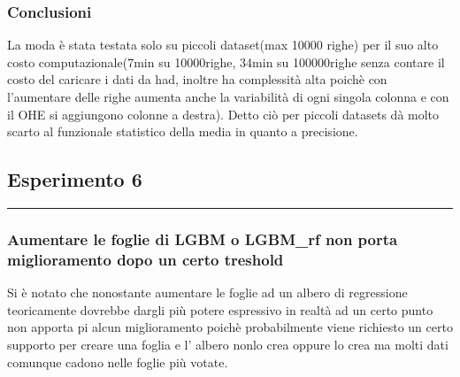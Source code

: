 \documentclass[11pt]{article}
\begin{document}
    \subsubsection{Conclusioni}\label{conclusioni}

La moda è stata testata solo su piccoli dataset(max 10000 righe) per il
suo alto costo computazionale(7min su 10000righe, 34min su 100000righe
senza contare il costo del caricare i dati da had, inoltre ha
complessità alta poichè con l'aumentare delle righe aumenta anche la
variabilità di ogni singola colonna e con il OHE si aggiungono colonne a
destra). Detto ciò per piccoli datasets dà molto scarto al funzionale
statistico della media in quanto a precisione.

    \subsection{Esperimento 6}\label{esperimento-6}

\begin{center}\rule{0.5\linewidth}{\linethickness}\end{center}

\subsubsection{Aumentare le foglie di LGBM o LGBM\_rf non porta
miglioramento dopo un certo
treshold}\label{aumentare-le-foglie-di-lgbm-o-lgbm_rf-non-porta-miglioramento-dopo-un-certo-treshold}

Si è notato che nonostante aumentare le foglie ad un albero di
regressione teoricamente dovrebbe dargli più potere espressivo in realtà
ad un certo punto non apporta pi alcun miglioramento poichè
probabilmente viene richiesto un certo supporto per creare una foglia e
l' albero nonlo crea oppure lo crea ma molti dati comunque cadono nelle
foglie più votate.
\end{document}
